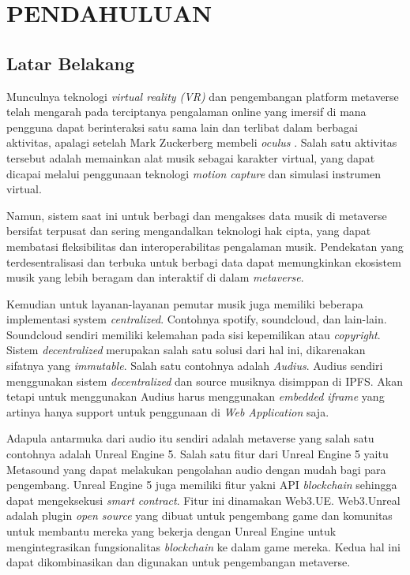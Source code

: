 \chapter{PENDAHULUAN}

\section{Latar Belakang}

Munculnya teknologi \emph{virtual reality (VR)} dan pengembangan platform metaverse telah mengarah pada terciptanya
pengalaman online yang imersif di mana pengguna dapat berinteraksi satu sama lain dan terlibat dalam berbagai aktivitas, apalagi setelah  Mark Zuckerberg
membeli \emph{oculus} \parencite{luckerson2014facebook}.
Salah satu aktivitas tersebut adalah memainkan alat musik sebagai karakter virtual, yang dapat dicapai melalui penggunaan
teknologi \emph{motion capture} dan simulasi instrumen virtual.

Namun, sistem saat ini untuk berbagi dan mengakses data musik di metaverse bersifat terpusat dan sering mengandalkan teknologi
hak cipta, yang dapat membatasi fleksibilitas dan interoperabilitas pengalaman musik. Pendekatan yang terdesentralisasi dan terbuka
untuk berbagi data dapat memungkinkan ekosistem musik yang lebih beragam dan interaktif di dalam \emph{metaverse}.

Kemudian untuk layanan-layanan pemutar musik juga memiliki beberapa implementasi system \emph{centralized}. Contohnya spotify, soundcloud, dan lain-lain.
Soundcloud sendiri memiliki kelemahan pada sisi kepemilikan atau \emph{copyright}. Sistem \emph{decentralized} merupakan salah satu solusi dari hal ini, dikarenakan
sifatnya yang \emph{immutable}. Salah satu contohnya adalah \emph{Audius}. Audius sendiri menggunakan sistem \emph{decentralized} dan source musiknya disimppan di IPFS.
Akan tetapi untuk menggunakan Audius harus menggunakan \emph{embedded iframe} yang artinya hanya support untuk penggunaan di \emph{Web Application} saja.

Adapula antarmuka dari audio itu sendiri adalah metaverse yang salah satu contohnya adalah Unreal Engine 5. Salah satu fitur dari Unreal Engine 5 yaitu Metasound yang dapat melakukan pengolahan audio dengan mudah bagi para pengembang. Unreal Engine 5 juga
memiliki fitur yakni API \emph{blockchain} sehingga dapat mengeksekusi \emph{smart contract}. Fitur ini dinamakan Web3.UE. Web3.Unreal adalah plugin
\emph{open source} yang dibuat untuk pengembang game dan komunitas untuk membantu mereka yang bekerja dengan Unreal Engine untuk mengintegrasikan
fungsionalitas \emph{blockchain} ke dalam game mereka. Kedua hal ini dapat dikombinasikan dan digunakan untuk
pengembangan metaverse.

